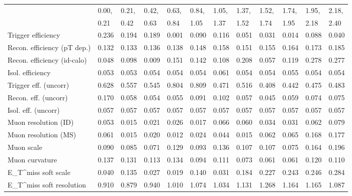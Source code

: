 \begin{tabular}{l|p{0.6cm}p{0.6cm}p{0.6cm}p{0.6cm}p{0.6cm}p{0.6cm}p{0.6cm}p{0.6cm}p{0.6cm}p{0.6cm}p{0.6cm}}
\hline
   & 0.00, & 0.21, & 0.42, & 0.63, & 0.84, & 1.05, & 1.37, & 1.52, & 1.74, & 1.95, & 2.18,  \\ 
   & 0.21 & 0.42 & 0.63 & 0.84 & 1.05 & 1.37 & 1.52 & 1.74 & 1.95 & 2.18 & 2.40  \\ 
\hline
Trigger efficiency                       & 0.236 & 0.194 & 0.189 & 0.001 & 0.090 & 0.116 & 0.051 & 0.031 & 0.014 & 0.088 & 0.040 \\
Recon. efficiency (pT dep.)              & 0.132 & 0.133 & 0.136 & 0.138 & 0.148 & 0.158 & 0.151 & 0.155 & 0.164 & 0.173 & 0.185 \\
Recon. efficiency (id-calo)              & 0.048 & 0.098 & 0.009 & 0.151 & 0.142 & 0.108 & 0.208 & 0.057 & 0.119 & 0.278 & 0.277 \\
Isol. efficiency                         & 0.053 & 0.053 & 0.054 & 0.054 & 0.054 & 0.061 & 0.054 & 0.054 & 0.055 & 0.054 & 0.054 \\
Trigger eff. (uncorr)                    & 0.628 & 0.557 & 0.545 & 0.804 & 0.809 & 0.471 & 0.516 & 0.408 & 0.442 & 0.475 & 0.483 \\
Recon. eff. (uncorr)                     & 0.170 & 0.058 & 0.054 & 0.055 & 0.091 & 0.102 & 0.057 & 0.045 & 0.059 & 0.074 & 0.075 \\
Isol. eff. (uncorr)                      & 0.057 & 0.057 & 0.057 & 0.057 & 0.057 & 0.057 & 0.057 & 0.057 & 0.057 & 0.057 & 0.057 \\
Muon resolution (ID)                     & 0.053 & 0.015 & 0.021 & 0.026 & 0.017 & 0.066 & 0.060 & 0.034 & 0.031 & 0.062 & 0.079 \\
Muon resolution (MS)                     & 0.061 & 0.015 & 0.020 & 0.012 & 0.024 & 0.044 & 0.015 & 0.062 & 0.065 & 0.168 & 0.177 \\
Muon scale                               & 0.090 & 0.085 & 0.071 & 0.129 & 0.093 & 0.136 & 0.107 & 0.107 & 0.075 & 0.164 & 0.196 \\
Muon curvature                           & 0.137 & 0.131 & 0.113 & 0.134 & 0.094 & 0.111 & 0.073 & 0.061 & 0.061 & 0.120 & 0.110 \\
E_{T}^{miss} soft scale                  & 0.040 & 0.135 & 0.027 & 0.019 & 0.140 & 0.031 & 0.184 & 0.227 & 0.243 & 0.246 & 0.284 \\
E_{T}^{miss} soft resolution             & 0.910 & 0.879 & 0.940 & 1.010 & 1.074 & 1.034 & 1.131 & 1.268 & 1.164 & 1.165 & 1.087 \\

\end{tabular}
